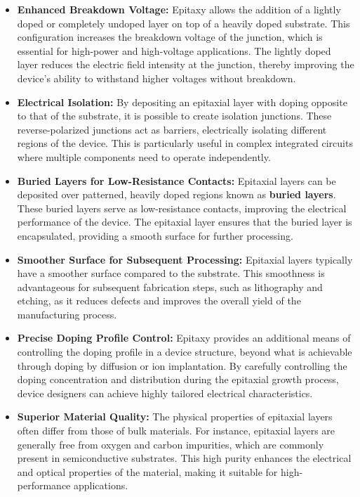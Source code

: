 \documentclass{report}
\begin{document}
\begin{itemize}
    \item \textbf{Enhanced Breakdown Voltage:} 
    Epitaxy allows the addition of a lightly doped or completely undoped layer on top of a heavily doped substrate. This configuration increases the breakdown voltage of the junction, which is essential for high-power and high-voltage applications. The lightly doped layer reduces the electric field intensity at the junction, thereby improving the device's ability to withstand higher voltages without breakdown.

    \item \textbf{Electrical Isolation:} 
    By depositing an epitaxial layer with doping opposite to that of the substrate, it is possible to create isolation junctions. These reverse-polarized junctions act as barriers, electrically isolating different regions of the device. This is particularly useful in complex integrated circuits where multiple components need to operate independently.

    \item \textbf{Buried Layers for Low-Resistance Contacts:} 
    Epitaxial layers can be deposited over patterned, heavily doped regions known as \textbf{buried layers}. These buried layers serve as low-resistance contacts, improving the electrical performance of the device. The epitaxial layer ensures that the buried layer is encapsulated, providing a smooth surface for further processing.

    \item \textbf{Smoother Surface for Subsequent Processing:} 
    Epitaxial layers typically have a smoother surface compared to the substrate. This smoothness is advantageous for subsequent fabrication steps, such as lithography and etching, as it reduces defects and improves the overall yield of the manufacturing process.

    \item \textbf{Precise Doping Profile Control:} 
    Epitaxy provides an additional means of controlling the doping profile in a device structure, beyond what is achievable through doping by diffusion or ion implantation. By carefully controlling the doping concentration and distribution during the epitaxial growth process, device designers can achieve highly tailored electrical characteristics.

    \item \textbf{Superior Material Quality:} 
    The physical properties of epitaxial layers often differ from those of bulk materials. For instance, epitaxial layers are generally free from oxygen and carbon impurities, which are commonly present in semiconductive substrates. This high purity enhances the electrical and optical properties of the material, making it suitable for high-performance applications.


\end{itemize}
\end{document}

